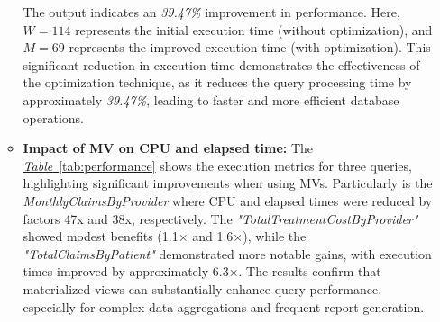 \begin{enumerate}
\begin{itemize}


\vspace{.4cm}

The output indicates an \textit{39.47\% }improvement in performance. Here, \( W = 114 \) represents the initial execution time (without optimization), and \( M = 69 \) represents the improved execution time (with optimization). This significant reduction in execution time demonstrates the effectiveness of the optimization technique, as it reduces the query processing time by approximately \textit{39.47\%}, leading to faster and more efficient database operations.

\item \textbf{Impact of MV on CPU and elapsed time:} The \hyperref[tab:performance]{\textit{Table}~\ref*{tab:performance}} shows the execution metrics for three queries, highlighting significant improvements when using MVs. Particularly is the \textit{MonthlyClaimsByProvider} where CPU and elapsed times were reduced by factors 47x and 38x, respectively. The \textit{"TotalTreatmentCostByProvider"} showed modest benefits (1.1× and 1.6×), while the  \textit{"TotalClaimsByPatient"} demonstrated more notable gains, with execution times improved by approximately 6.3×. The results confirm that materialized views can substantially enhance query performance, especially for complex data aggregations and frequent report generation.

\clearpage

%








\end{itemize}
\end{enumerate}
